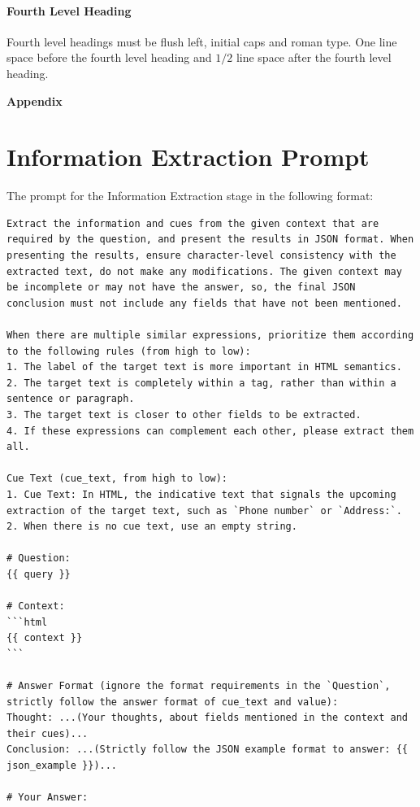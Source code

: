 \documentclass[a4paper]{article}
\begin{document}
\paragraph{Fourth Level Heading}

Fourth level headings must be flush left, initial caps and roman type.
One line space before the fourth level heading and $1/2$ line
space after the fourth level heading.

% 
{}

\clearpage
\onecolumn

\appendix

\centerline{\Large\bfseries Appendix}

\section{Information Extraction Prompt}
\label{sec:ie_prompt}

The prompt for the Information Extraction stage in the following format:

\begin{tcolorbox}
  \begin{lstlisting}[language={}, basicstyle=\ttfamily, columns=fullflexible, breaklines=true]
Extract the information and cues from the given context that are required by the question, and present the results in JSON format. When presenting the results, ensure character-level consistency with the extracted text, do not make any modifications. The given context may be incomplete or may not have the answer, so, the final JSON conclusion must not include any fields that have not been mentioned.

When there are multiple similar expressions, prioritize them according to the following rules (from high to low):
1. The label of the target text is more important in HTML semantics.
2. The target text is completely within a tag, rather than within a sentence or paragraph.
3. The target text is closer to other fields to be extracted.
4. If these expressions can complement each other, please extract them all.

Cue Text (cue_text, from high to low):
1. Cue Text: In HTML, the indicative text that signals the upcoming extraction of the target text, such as `Phone number` or `Address:`.
2. When there is no cue text, use an empty string.

# Question:
{{ query }}

# Context:
```html
{{ context }}
```

# Answer Format (ignore the format requirements in the `Question`, strictly follow the answer format of cue_text and value):
Thought: ...(Your thoughts, about fields mentioned in the context and their cues)...
Conclusion: ...(Strictly follow the JSON example format to answer: {{ json_example }})...

# Your Answer:
\end{lstlisting}
\end{tcolorbox}
\end{document}
